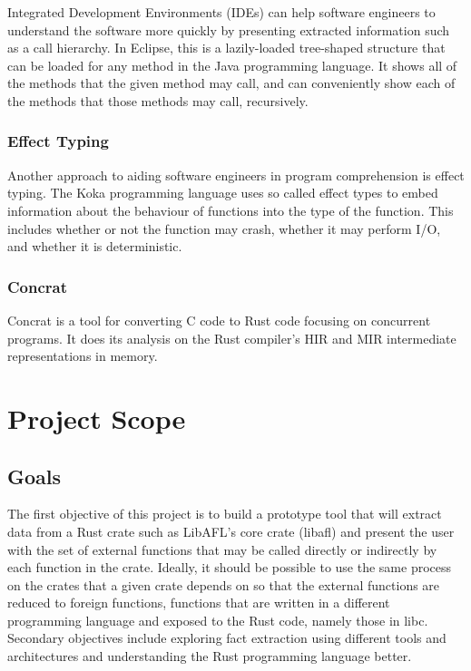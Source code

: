 \documentclass[11pt]{article}
\begin{document}
Integrated Development Environments (IDEs) can help software engineers to understand the software more quickly by presenting extracted information such as a call hierarchy.
In Eclipse, this is a lazily-loaded tree-shaped structure that can be loaded for any method in the Java programming language.
It shows all of the methods that the given method may call, and can conveniently show each of the methods that those methods may call, recursively.

\subsubsection{Effect Typing}

Another approach to aiding software engineers in program comprehension is effect typing.
The Koka programming language uses so called effect types to embed information about the behaviour of functions into the type of the function.
This includes whether or not the function may crash, whether it may perform I/O, and whether it is deterministic.

\subsubsection{Concrat}
Concrat is a tool for converting C code to Rust code focusing on concurrent programs.
It does its analysis on the Rust compiler's HIR and MIR intermediate representations in memory.

\section{Project Scope}


\subsection{Goals}

The first objective of this project is to build a prototype tool that will extract data from a Rust crate such as LibAFL's core crate (libafl) and present the user with the set of external functions that may be called directly or indirectly by each function in the crate.
Ideally, it should be possible to use the same process on the crates that a given crate depends on so that the external functions are reduced to foreign functions, functions that are written in a different programming language and exposed to the Rust code, namely those in libc.
Secondary objectives include exploring fact extraction using different tools and architectures and understanding the Rust programming language better.
\end{document}
